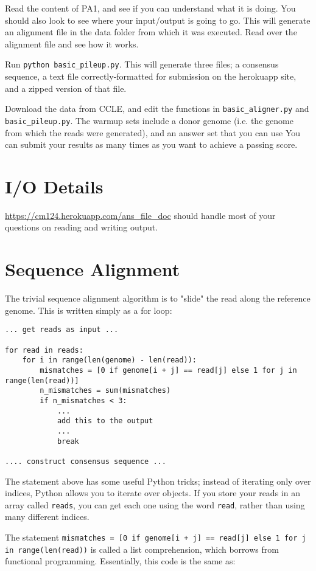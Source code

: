 \documentclass{article}
\begin{document}
Read the content of PA1, and see if you can understand what it is doing. You should also look to see where your input/output is going to go. This will generate an alignment file in the data folder from which it was executed. Read over the alignment file and see how it works.

Run \verb|python basic_pileup.py|. This will generate three files; a consensus sequence, a text file correctly-formatted for submission on the herokuapp site, and a zipped version of that file.

Download the data from CCLE, and edit the functions in \verb|basic_aligner.py| and 
\verb|basic_pileup.py|. The warmup sets include a donor genome (i.e. the genome from which the reads were generated), and an answer set that you can use 
You can submit your results as many times as you want to achieve a passing score.

\section*{I/O Details}
\url{https://cm124.herokuapp.com/ans_file_doc} should handle most of your questions on reading and writing output.

\section*{Sequence Alignment}
The trivial sequence alignment algorithm is to "slide" the read along the reference genome. This is written simply as a for loop:

\begin{verbatim}
... get reads as input ...

for read in reads:
    for i in range(len(genome) - len(read)):
	    mismatches = [0 if genome[i + j] == read[j] else 1 for j in range(len(read))]
	    n_mismatches = sum(mismatches)
	    if n_mismatches < 3:
		    ...
		    add this to the output
		    ...
		    break
		    
.... construct consensus sequence ...
\end{verbatim}

The statement above has some useful Python tricks; instead of iterating only over indices, Python allows you to iterate over objects. If you store your reads in an array called \verb!reads!, you can get each one using the word \verb!read!, rather than using many different indices.

The statement \verb~mismatches = [0 if genome[i + j] == read[j] else 1 for j in range(len(read))~ is called a list comprehension, which borrows from functional programming. Essentially, this code is the same as:
\end{document}
